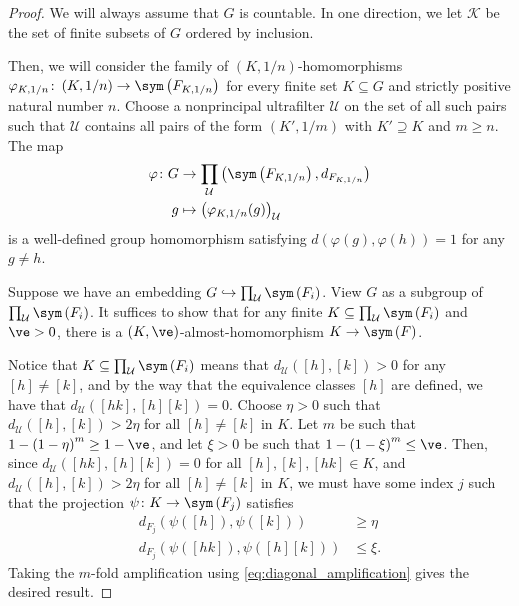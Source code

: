 \documentclass[10pt]{mypackage}
\begin{document}
\begin{proof}
  We will always assume that $G$ is countable. In one direction, we let $ \mathcal{K} $ be the set of finite subsets of $G$ ordered by inclusion.

  Then, we will consider the family of $\left( K,1/n \right)$-homomorphisms $\varphi_{K,1/n}\colon \left( K,1/n \right)\rightarrow \sym\left( F_{K,1/n} \right)$ for every finite set $K\subseteq G$ and strictly positive natural number $n$. Choose a nonprincipal ultrafilter $ \mathcal{U} $ on the set of all such pairs such that $ \mathcal{U} $ contains all pairs of the form $\left( K',1/m \right)$ with $K'\supseteq K$ and $m\geq n$. The map 
  \begin{align*}
    \varphi\colon G&\rightarrow \prod_{\mathcal{U}}\left( \sym\left( F_{K,1/n} \right),d_{F_{K,1/n}} \right)\\
    g &\mapsto \left( \varphi_{K,1/n}(g) \right)_{\mathcal{U}}
  \end{align*}
  is a well-defined group homomorphism satisfying $d\left( \varphi(g),\varphi(h) \right)= 1$ for any $g\neq h$.

  Suppose we have an embedding $G\hookrightarrow \prod_{\mathcal{U}}\sym\left( F_i \right)$. View $G$ as a subgroup of $\prod_{\mathcal{U}}\sym\left( F_i \right)$. It suffices to show that for any finite $K\subseteq \prod_{\mathcal{U}}\sym\left( F_i \right)$ and $\ve > 0$, there is a $\left( K,\ve \right)$-almost-homomorphism $K\to \sym\left( F \right)$.

  Notice that $K\subseteq \prod_{\mathcal{U}}\sym\left( F_i \right)$ means that $d_{\mathcal{U}}\left( \left[ h \right],\left[ k \right] \right) > 0$ for any $\left[ h \right]\neq \left[ k \right]$, and by the way that the equivalence classes $\left[ h \right]$ are defined, we have that $d_{\mathcal{U}}\left( \left[ hk \right],\left[ h \right]\left[ k \right] \right) = 0$. Choose $\eta > 0$ such that $d_{\mathcal{U}}\left( \left[ h \right],\left[ k \right] \right) > 2\eta$ for all $\left[ h \right]\neq \left[ k \right]$ in $K$. Let $m$ be such that $1-\left( 1-\eta \right)^{m}\geq 1-\ve$, and let $\xi > 0$ be such that $1-\left( 1-\xi \right)^{m} \leq \ve$. Then, since $d_{\mathcal{U}}\left( \left[ hk \right],\left[ h \right]\left[ k \right] \right) = 0$ for all $\left[ h \right],\left[ k \right],\left[ hk \right]\in K$, and $d_{\mathcal{U}}\left( \left[ h \right],\left[ k \right] \right) > 2\eta$ for all $\left[ h \right]\neq \left[ k \right]$ in $K$, we must have some index $j$ such that the projection $\psi\colon K\to \sym\left( F_j \right)$ satisfies
  \begin{align*}
    d_{F_j}\left( \psi\left(\left[ h \right]\right),\psi\left( \left[ k \right] \right) \right) &\geq \eta\\
    d_{F_j} \left( \psi\left( \left[ hk \right] \right),\psi\left( \left[ h \right]\left[ k \right] \right) \right) &\leq \xi.
  \end{align*}
  Taking the $m$-fold amplification using \eqref{eq:diagonal_amplification} gives the desired result.
\end{proof}
\end{document}
